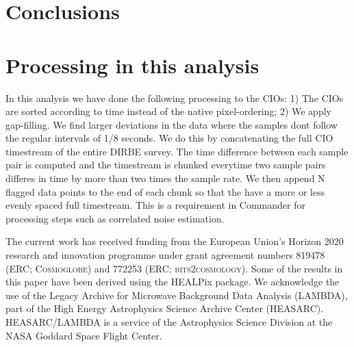 \documentclass{aa}
\begin{document}
\section{Conclusions}
\blindtext

\section{Processing in this analysis}
In this analysis we have done the following processing to the CIOs:
1) The CIOs are sorted according to time instead of the native pixel-ordering; 2) We apply gap-filling. We find larger deviations in the data where the samples dont follow the regular intervals of 1/8 seconds. We do this by concatenating the full CIO timestream of the entire DIRBE survey. The time difference between each sample pair is computed and the timestream is chunked everytime two sample pairs differes in time by more than two times the sample rate. We then append N flagged data points to the end of each chunk so that the have a more or less evenly spaced full timestream. This is a requirement in Commander for processing steps such as correlated noise estimation.




\begin{acknowledgements}
 The current work has received funding from the European
  Union’s Horizon 2020 research and innovation programme under grant
  agreement numbers 819478 (ERC; \textsc{Cosmoglobe}) and 772253 (ERC;
  \textsc{bits2cosmology}). Some of the results in this paper have been derived using the HEALPix \citep{HEALPIX} package.
  We acknowledge the use of the Legacy Archive for Microwave Background Data
  Analysis (LAMBDA), part of the High Energy Astrophysics Science Archive Center
  (HEASARC). HEASARC/LAMBDA is a service of the Astrophysics Science Division at
  the NASA Goddard Space Flight Center.  
\end{acknowledgements}


%



\end{document}
